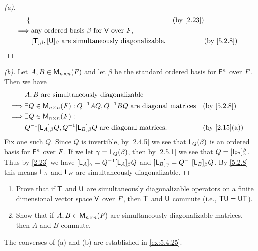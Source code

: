 \begin{proof}[(a)]
\begin{align*}
\begin{dcases}
		           \end{dcases} &  & \by{2.23}                    \\
		\implies & \text{any ordered basis } \beta \text{ for } \V \text{ over } \F,                                                                                                                                                                                 \\
		         & [\T]_{\beta}, [\U]_{\beta} \text{ are simultaneously diagonalizable}.                                                                                                                                                             &  & \by{5.2.8}
	\end{align*}
\end{proof}

\begin{proof}[(b)]
	Let \(A, B \in \ms[n][n][\F]\) and let \(\beta\) be the standard ordered basis for \(\mathsf{F}^n\) over \(\mathit{F}\).
	Then we have
	\begin{align*}
		         & A, B \text{ are simultaneously diagonalizable}                                                       \\
		\implies & \exists Q \in \ms[n][n][\F] : Q^{-1} A Q, Q^{-1} B Q \text{ are diagonal matrices} &  & \by{5.2.8}   \\
		\implies & \exists Q \in \ms[n][n][\F] :                                                                        \\
		         & Q^{-1} [\L_A]_{\beta} Q, Q^{-1} [\L_B]_{\beta} Q \text{ are diagonal matrices}.    &  & \by{2.15}[a]
	\end{align*}
	Fix one such \(Q\).
	Since \(Q\) is invertible, by \cref{2.4.5} we see that \(\mathsf{L}_Q(\beta)\) is an ordered basis for \(\mathsf{F}^n\) over \(\mathit{F}\).
	If we let \(\gamma = \mathsf{L}_Q(\beta)\), then by \cref{2.5.1} we see that \(Q = [\IT[\vs{F}^n]]_{\gamma}^{\beta}\).
	Thus by \cref{2.23} we have \([\mathsf{L}_A]_{\gamma} = Q^{-1} [\mathsf{L}_A]_{\beta} Q\) and \([\mathsf{L}_B]_{\gamma} = Q^{-1} [\mathsf{L}_B]_{\beta} Q\).
	By \cref{5.2.8} this means \(\mathsf{L}_A\) and \(\mathsf{L}_B\) are simultaneously diagonalizable.
\end{proof}

\begin{ex}\label{ex:5.2.18}
	\begin{enumerate}
		\item Prove that if \(\mathsf{T}\) and \(\mathsf{U}\) are simultaneously diagonalizable operators on a finite dimensional vector space \(\mathsf{V}\) over \(\mathit{F}\), then \(\mathsf{T}\) and \(\mathsf{U}\) commute (i.e., \(\mathsf{T} \mathsf{U} = \mathsf{U} \mathsf{T}\)).
		\item Show that if \(A, B \in \ms[n][n][\F]\) are simultaneously diagonalizable matrices, then \(A\) and \(B\) commute.
	\end{enumerate}
	The converses of (a) and (b) are established in \cref{ex:5.4.25}.
\end{ex}

